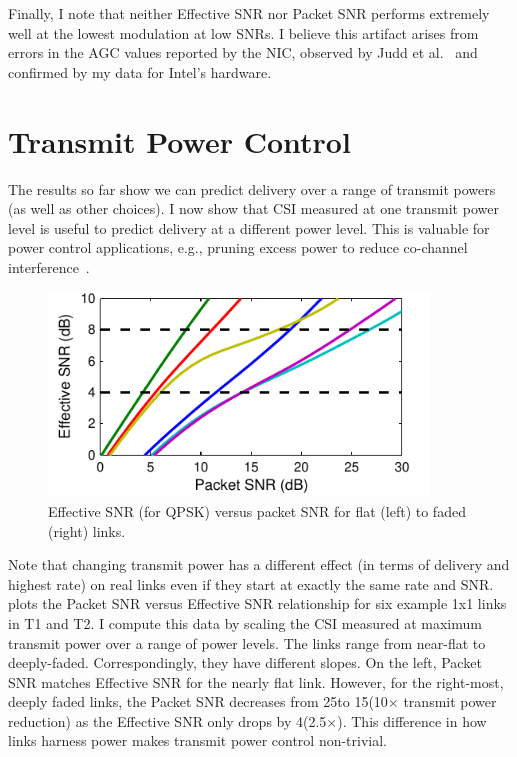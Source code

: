 Finally, I note that neither Effective SNR nor Packet SNR performs extremely well at the lowest modulation at low SNRs. I believe this artifact arises from errors in the AGC values reported by the NIC, observed by Judd et al.~\cite{Judd_CHARM} and confirmed by my data for Intel's hardware.

\section{Transmit Power Control}
\label{sec:tx_power_trim}
The results so far show we can predict delivery over a range of transmit powers (as well as other choices). I now show that CSI measured at one transmit power level is useful to predict delivery at a different power level. This is valuable for power control applications, e.g., pruning excess power to reduce co-channel interference~\cite{symphony09, power_control_study, pcmac}. 

\begin{figure}[t]
  \centering
  \includegraphics[width=0.9\textwidth]{figures/eff_vs_snr_qpsk.pdf}
  \caption{Effective SNR (for QPSK) versus packet SNR for flat (left) to faded (right) links.}
  \label{fig:eff_vs_rssi}
\end{figure}

Note that changing transmit power has a different effect (in terms of delivery and highest rate) on real links even if they start at exactly the same rate and SNR.  plots the Packet SNR versus Effective SNR relationship for six example 1x1 links in T1 and T2.
I compute this data by scaling the CSI measured at maximum transmit power over a range of power levels.
The links range from near-flat to deeply-faded. Correspondingly, they have different slopes. On the left, Packet SNR matches Effective SNR for the nearly flat link. 
However, for the right-most, deeply faded links, the Packet SNR decreases from 25\dB to 15\dB (10$\times$ transmit power reduction) as the Effective SNR only drops by 4\dB (2.5$\times$). This difference in how links harness power makes transmit power control non-trivial.


